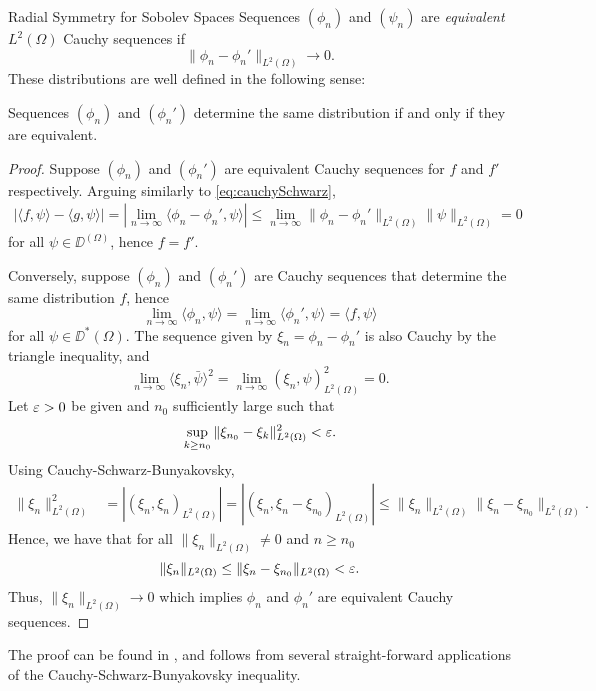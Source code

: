 \begin{chapter}{Radial Symmetry for Sobolev Spaces}
Sequences $(\phi_n)$ and $(\psi_n)$ are \emph{equivalent} $L^2(\Omega)$ Cauchy sequences if
\begin{equation}\label{eq:cauchyEquivalence}
  \|\phi_n - \phi_n'\|_{L^2(\Omega)} \to 0.
\end{equation}
These distributions are well defined in the following sense: 
\begin{prop} \label{prop:cauchyCorrespondence}
  Sequences $(\phi_n)$ and $(\phi_n')$ determine the same distribution if and only if they are equivalent.
\end{prop}
\begin{com}
\begin{proof}
  Suppose $(\phi_n)$ and $(\phi_n')$ are equivalent Cauchy sequences for $f$ and $f'$ respectively.
  Arguing similarly to \eqref{eq:cauchySchwarz},
  \begin{align} 
    |\langle f, \psi\rangle - \langle g, \psi\rangle| = \left|\lim_{n\to \infty}\langle \phi_n - \phi_n', \psi\rangle\right| \le \lim_{n\to\infty}\|\phi_n - \phi_n'\|_{L^2(\Omega)}\|\psi\|_{L^2(\Omega)} =  0
  \end{align} 
  for all $\psi \in \DD^(\Omega)$, hence $f = f'$.

  Conversely, suppose $(\phi_n)$ and $(\phi_n')$ are Cauchy sequences that determine the same distribution $f$, hence
  \begin{equation}
    \lim_{n\to\infty} \langle \phi_n,\psi\rangle = \lim_{n\to\infty} \langle \phi_n',\psi\rangle = \langle f,\psi\rangle
  \end{equation}
  for all $\psi \in \DD^*(\Omega)$.
  The sequence given by $\xi_n = \phi_n - \phi_n'$ is also Cauchy by the triangle inequality, and 
  \begin{equation}
    \lim_{n\to\infty}\langle \xi_n,\bar{\psi}\rangle^2 = \lim_{n\to\infty} (\xi_n,\psi)_{L^2(\Omega)}^2 = 0.
  \end{equation}
  Let $\varepsilon >0$ be given and $n_0$ sufficiently large such that 
  \begin{equation}
    \sup_{k\ge n_0} \|\xi_{n_0} - \xi_k\|_{L^2(\Omega)}^2 < \varepsilon.
  \end{equation}
  Using Cauchy-Schwarz-Bunyakovsky,
  \begin{align}
    \|\xi_n\|_{L^2(\Omega)}^2 &= |(\xi_n,\xi_n)_{L^2(\Omega)}| = |(\xi_n,\xi_n - \xi_{n_0})_{L^2(\Omega)}| \le \|\xi_n\|_{L^2(\Omega)}\|\xi_n-\xi_{n_0}\|_{L^2(\Omega)}.
  \end{align}
  Hence, we have that for all $\|\xi_n\|_{L^2(\Omega)} \not= 0$ and $n \ge n_0$
  \begin{equation}
    \|\xi_n\|_{L^2(\Omega)} \le \|\xi_n - \xi_{n_0}\|_{L^2(\Omega)} < \varepsilon.
  \end{equation}
  Thus, $\|\xi_n\|_{L^2(\Omega)} \to 0$ which implies $\phi_n$ and $\phi_n'$ are equivalent Cauchy sequences.
\end{proof}
\end{com}
The proof can be found in \citep{richtmyer1978principles}, and follows from several straight-forward applications of the Cauchy-Schwarz-Bunyakovsky inequality.


\end{chapter}
